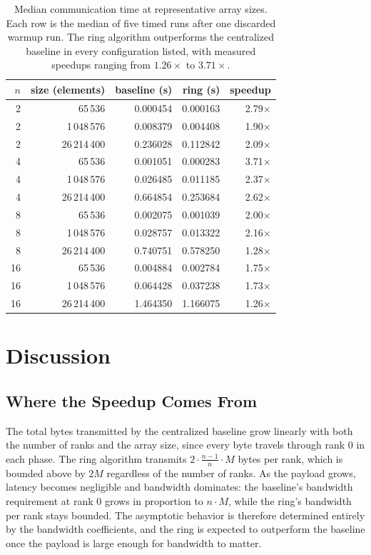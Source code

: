\documentclass[12pt,a4paper]{article}
\begin{document}
\begin{table}[h]
\centering
\small
\begin{tabular}{rrrrr}
\toprule
$n$ & size (elements) & baseline (s) & ring (s) & speedup \\
\midrule
2  & 65\,536      & 0.000454 & 0.000163 & 2.79$\times$ \\
2  & 1\,048\,576  & 0.008379 & 0.004408 & 1.90$\times$ \\
2  & 26\,214\,400 & 0.236028 & 0.112842 & 2.09$\times$ \\
\midrule
4  & 65\,536      & 0.001051 & 0.000283 & 3.71$\times$ \\
4  & 1\,048\,576  & 0.026485 & 0.011185 & 2.37$\times$ \\
4  & 26\,214\,400 & 0.664854 & 0.253684 & 2.62$\times$ \\
\midrule
8  & 65\,536      & 0.002075 & 0.001039 & 2.00$\times$ \\
8  & 1\,048\,576  & 0.028757 & 0.013322 & 2.16$\times$ \\
8  & 26\,214\,400 & 0.740751 & 0.578250 & 1.28$\times$ \\
\midrule
16 & 65\,536      & 0.004884 & 0.002784 & 1.75$\times$ \\
16 & 1\,048\,576  & 0.064428 & 0.037238 & 1.73$\times$ \\
16 & 26\,214\,400 & 1.464350 & 1.166075 & 1.26$\times$ \\
\bottomrule
\end{tabular}
\caption{Median communication time at representative array sizes. Each row is the median of five timed runs after one discarded warmup run. The ring algorithm outperforms the centralized baseline in every configuration listed, with measured speedups ranging from $1.26\times$ to $3.71\times$.}
\label{tab:summary}
\end{table}

\section{Discussion}
\label{sec:discussion}

\subsection{Where the Speedup Comes From}

The total bytes transmitted by the centralized baseline grow linearly with both the number of ranks and the array size, since every byte travels through rank 0 in each phase. The ring algorithm transmits $2 \cdot \frac{n-1}{n} \cdot M$ bytes per rank, which is bounded above by $2M$ regardless of the number of ranks. As the payload grows, latency becomes negligible and bandwidth dominates: the baseline's bandwidth requirement at rank 0 grows in proportion to $n \cdot M$, while the ring's bandwidth per rank stays bounded. The asymptotic behavior is therefore determined entirely by the bandwidth coefficients, and the ring is expected to outperform the baseline once the payload is large enough for bandwidth to matter.
\end{document}
